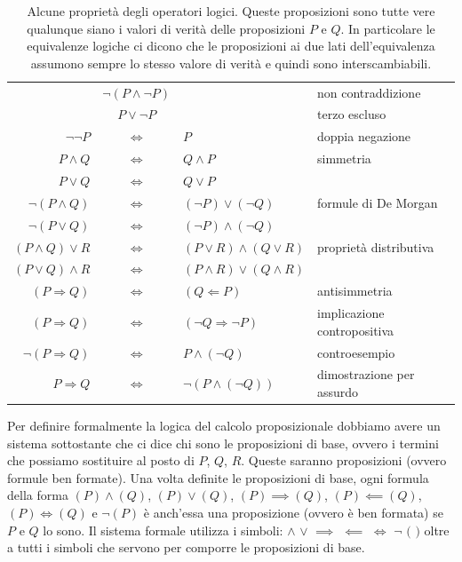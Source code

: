 \begin{table}
\begin{tabular}{rcll}
                          &$\neg (P \land \neg P)$&                              & non contraddizione \\
                         &$P \lor \neg P$&                                       & terzo escluso \\
                         $\neg \neg P$ & $\iff$ & $ P$                           & doppia negazione\\
                                    $P \land Q$ & $\iff$ & $ Q \land P$                   & simmetria\\
                                     $P \lor Q$ & $\iff$ & $ Q \lor P$                    & \\
                              $\neg (P\land Q)$ & $\iff$ & $ (\neg P) \lor (\neg Q)$      & formule di De Morgan\\
                               $\neg (P\lor Q)$ & $\iff$ & $ (\neg P) \land (\neg Q)$     & \\
                            $(P\land Q) \lor R$ & $\iff$ & $ (P\lor R) \land (Q \lor R)$  & proprietà distributiva\\
                            $(P\lor Q) \land R$ & $\iff$ & $ (P\land R) \lor (Q \land R)$ & \\
                            $(P \Rightarrow Q)$ & $\iff$ & $ (Q \Leftarrow P)$            & antisimmetria\\
                            $(P\Rightarrow Q)$ & $\iff$ & $ (\neg Q\Rightarrow\neg P)$   & implicazione contropositiva\\
                        $\neg (P\Rightarrow Q)$ & $\iff$ & $ P \land (\neg Q)$            & controesempio\\
                             $P\Rightarrow Q$ & $\iff$ & $ \lnot(P \land (\neg Q))$     & dimostrazione per assurdo
\end{tabular}
\caption{Alcune proprietà degli operatori logici. Queste proposizioni sono tutte vere qualunque siano i valori di verità delle proposizioni $P$ e $Q$. In particolare le equivalenze logiche ci dicono che le proposizioni ai due lati dell'equivalenza assumono sempre lo stesso valore di verità e quindi sono interscambiabili.}
\label{tab:operatori_logici}
\end{table}

Per definire formalmente la logica del calcolo proposizionale
dobbiamo avere un sistema sottostante che ci dice chi sono 
le proposizioni di base, ovvero i termini che possiamo sostituire al posto 
di $P$, $Q$, $R$. 
Queste saranno proposizioni (ovvero formule ben formate).
Una volta definite le proposizioni di base,
ogni formula della forma
$(P)\land(Q)$, $(P)\lor(Q)$, $(P)\implies(Q)$, 
$(P)\impliedby (Q)$, $(P)\Leftrightarrow(Q)$ e
$\lnot(P)$
è anch'essa una proposizione (ovvero è ben formata) 
se $P$ e $Q$ lo sono. 
Il sistema formale utilizza i simboli: 
$\land$ $\lor$ $\implies$ $\impliedby$ $\Leftrightarrow$
$\lnot$ $($ $)$ oltre a tutti i simboli che servono per 
comporre le proposizioni di base.

